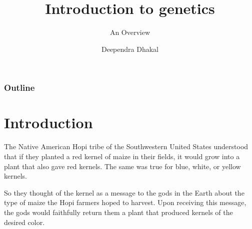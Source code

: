 \documentclass[11pt,ignorenonframetext,aspectratio=169]{beamer}
\title[]{Introduction to genetics}
\subtitle{An Overview}
\author[
        Deependra Dhakal
    ]{Deependra Dhakal}
\institute[
    ]{
    Agriculture and Forestry University\\
\textit{ddhakal.rookie@gmail.com}\\
\url{https://rookie.rbind.io}
    }
\date[
      
  ]{
    }
\begin{document}
  \begin{frame}[plain]
  \titlepage
  \end{frame}


  \begin{frame}
  \frametitle{Outline} %
  \end{frame}

\hypertarget{introduction}{%
\section{Introduction}\label{introduction}}

\begin{frame}{}
\protect\hypertarget{section}{}
The Native American Hopi tribe of the Southwestern United States
understood that if they planted a red kernel of maize in their fields,
it would grow into a plant that also gave red kernels. The same was true
for blue, white, or yellow kernels.

So they thought of the kernel as a message to the gods in the Earth
about the type of maize the Hopi farmers hoped to harvest. Upon
receiving this message, the gods would faithfully return them a plant
that produced kernels of the desired color.
\end{frame}
\end{document}
